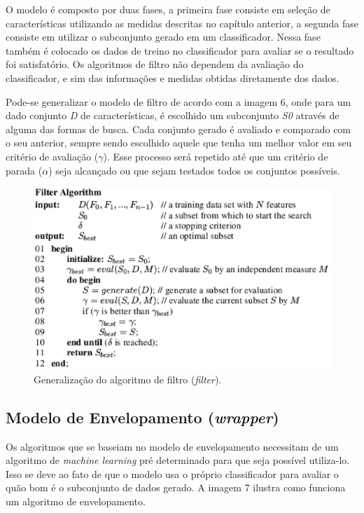 O modelo é composto por duas fases, a primeira fase consiste em seleção de características utilizando as medidas descritas no capítulo anterior, a segunda fase consiste em utilizar o subconjunto gerado em um classificador. Nessa fase também é colocado os dados de treino no classificador para avaliar se o resultado foi satisfatório. Os algoritmos de filtro não dependem da avaliação do classificador, e sim das informações e medidas obtidas diretamente dos dados. \cite{huan_1998}

Pode-se generalizar o modelo de filtro de acordo com a imagem 6, onde para um dado conjunto \textit{D} de características, é escolhido um subconjunto \textit{S0} através de alguma das formas de busca. Cada conjunto gerado é avaliado e comparado com o seu anterior, sempre sendo escolhido aquele que tenha um melhor valor em seu critério de avaliação ($\gamma$). Esse processo será repetido até que um critério de parada ($\alpha$) seja alcançado ou que sejam testados todos os conjuntos possíveis. \cite{liu_2005}

\begin{figure}[h]
	\centering
	\label{fig06}
		\includegraphics[keepaspectratio=true,scale=0.7]{figuras/fig07.eps}
	\caption{Generalização do algoritmo de filtro (\textit{filter}). \cite{liu_2005}}
\end{figure}

\subsection{Modelo de Envelopamento (\textit{wrapper})}

Os algoritmos que se baseiam no modelo de envelopamento necessitam de um algoritmo de \textit{machine learning} pré determinado para que seja possível utiliza-lo. Isso se deve ao fato de que o modelo usa o próprio classificador para avaliar o quão bom é o subconjunto de dados gerado. A imagem 7 ilustra como funciona um algoritmo de envelopamento.

